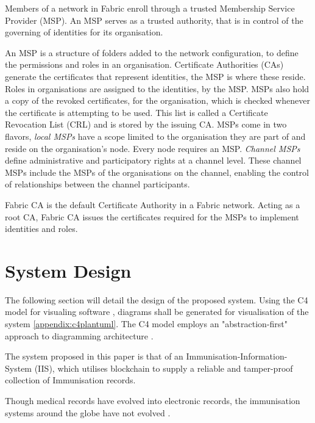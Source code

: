 Members of a network in Fabric enroll through a trusted Membership Service Provider (MSP). \cite{noauthor_introduction_nodate}
An MSP serves as a trusted authority, that is in control of the governing of identities for its organisation. 

An MSP is a structure of folders added to the network configuration, to define the permissions and roles in an organisation. 
Certificate Authorities (CAs) generate the certificates that represent identities, the MSP is where these reside. 
Roles in organisations are assigned to the identities, by the MSP. 
MSPs also hold a copy of the revoked certificates, for the organisation, which is checked whenever the certificate is attempting to be used. \cite{noauthor_membership_nodate}
This list is called a Certificate Revocation List (CRL) \cite{cooper_internet_nodate} and is stored by the issuing CA. \cite{noauthor_identity_nodate}
MSPs come in two flavors, \emph{local MSPs} have a scope limited to the organisation they are part of and reside on the organisation's node. Every node requires an MSP.
\emph{Channel MSPs} define administrative and participatory rights at a channel level. These channel MSPs include the MSPs of the organisations on the channel, enabling the control of relationships between the channel participants. \cite{noauthor_membership_nodate}

Fabric CA is the default Certificate Authority in a Fabric network. Acting as a root CA, Fabric CA issues the certificates required for the MSPs to implement identities and roles. \cite{noauthor_identity_nodate}

\section{System Design}

The following section will detail the design of the proposed system.
Using the C4 model for visualing software \cite{noauthor_c4_nodate}, diagrams shall be generated for visualisation of the system \ref{appendix:c4plantuml}.
The C4 model employs an "abstraction-first" approach to diagramming architecture \cite{noauthor_c4_nodate}. 

The system proposed in this paper is that of an Immunisation-Information-System (IIS), which utilises blockchain to supply a reliable and tamper-proof collection of Immunisation records. 

Though medical records have evolved into electronic records, the immunisation systems around the globe have not evolved \cite{abbas_review_2014}.


